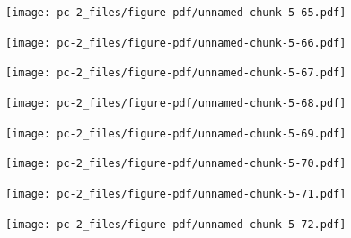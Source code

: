 \documentclass[
  letterpaper,
  DIV=11,
  numbers=noendperiod]{scrreprt}
\begin{document}
\begin{figure}[H]

{\centering \texttt{[image: pc-2\_files/figure-pdf/unnamed-chunk-5-65.pdf]}

}

\end{figure}

\begin{figure}[H]

{\centering \texttt{[image: pc-2\_files/figure-pdf/unnamed-chunk-5-66.pdf]}

}

\end{figure}

\begin{figure}[H]

{\centering \texttt{[image: pc-2\_files/figure-pdf/unnamed-chunk-5-67.pdf]}

}

\end{figure}

\begin{figure}[H]

{\centering \texttt{[image: pc-2\_files/figure-pdf/unnamed-chunk-5-68.pdf]}

}

\end{figure}

\begin{figure}[H]

{\centering \texttt{[image: pc-2\_files/figure-pdf/unnamed-chunk-5-69.pdf]}

}

\end{figure}

\begin{figure}[H]

{\centering \texttt{[image: pc-2\_files/figure-pdf/unnamed-chunk-5-70.pdf]}

}

\end{figure}

\begin{figure}[H]

{\centering \texttt{[image: pc-2\_files/figure-pdf/unnamed-chunk-5-71.pdf]}

}

\end{figure}

\begin{figure}[H]

{\centering \texttt{[image: pc-2\_files/figure-pdf/unnamed-chunk-5-72.pdf]}

}

\end{figure}
\end{document}
